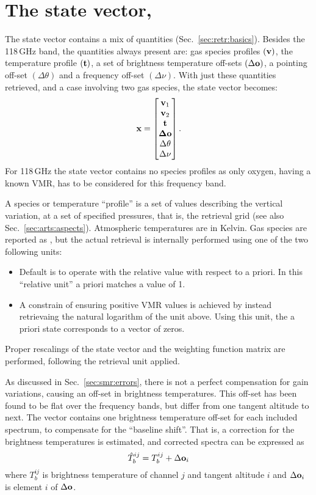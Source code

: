 \section{The state vector, \SttVct}
\label{sec:x}
%
The state vector contains a mix of quantities (Sec.~\ref{sec:retr:basics}).
Besides the 118\,GHz band, the quantities always present are: gas species
profiles $(\mathbf{v})$, the temperature profile $(\mathbf{t})$, a set of
brightness temperature off-sets $(\Delta\mathbf{o})$, a pointing off-set
$(\Delta\theta)$ and a frequency off-set $(\Delta\nu)$. With
just these quantities retrieved, and a case involving two gas species, the
state vector becomes:
\begin{equation}
  \label{eq:x:example}
  \mathbf{x} =
  \begin{bmatrix}
    \mathbf{v}_1\\ 
    \mathbf{v}_2\\ 
    \mathbf{t}\\ 
    \mathbf{\Delta\mathbf{o}}\\ 
    \Delta\theta\\ 
    \Delta\nu 
  \end{bmatrix}.
\end{equation}
For 118\,GHz the state vector contains no species profiles as only oxygen,
having a known VMR, has to be considered for this frequency band.

A species or temperature ``profile'' is a set of values describing the vertical
variation, at a set of specified pressures, that is, the retrieval grid (see
also Sec.~\ref{sec:arts:aspects}). Atmospheric temperatures are in Kelvin. Gas
species are reported as \VMR, but the actual retrieval is internally performed
using one of the two following units:
\begin{itemize}
\item Default is to operate with the relative value with respect to a priori.
  In this ``relative unit'' a priori matches a value of 1.
\item A constrain of ensuring positive VMR values is achieved by instead
  retrievaing the natural logarithm of the unit above. Using this unit, the a
  priori state corresponds to a vector of zeros.
\end{itemize}
Proper rescalings of the state vector and the weighting function matrix are
performed, following the retrieval unit applied.


As discussed in Sec.~\ref{sec:smr:errors}, there is not a perfect compensation
for gain variations, causing an off-set in brightness temperatures. This
off-set has been found to be flat over the frequency bands, but differ from one
tangent altitude to next. The vector  contains one
brightness temperature off-set for each included spectrum, to compensate for
the ``baseline shift''. That is, a correction for the brightness temperatures is
estimated, and corrected spectra can be expressed as
\begin{equation}
  \label{eq:retr:baseline}
  \hat{T}_b^{ij} = T_b^{ij} + \Delta\mathbf{o}_i
\end{equation}
where $T_b^{ij}$ is brightness temperature of channel $j$ and tangent altitude
$i$ and $\Delta\mathbf{o}_i$ is element $i$ of $\Delta\mathbf{o}$.

